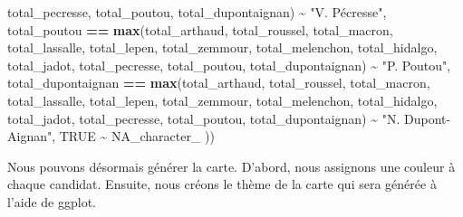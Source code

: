 \documentclass[
]{article}
\newenvironment{Shaded}{\begin{snugshade}}{\end{snugshade}}
\newcommand{\ConstantTok}[1]{\textcolor[rgb]{0.56,0.35,0.01}{#1}}
\newcommand{\FunctionTok}[1]{\textcolor[rgb]{0.13,0.29,0.53}{\textbf{#1}}}
\newcommand{\NormalTok}[1]{#1}
\newcommand{\SpecialCharTok}[1]{\textcolor[rgb]{0.81,0.36,0.00}{\textbf{#1}}}
\newcommand{\StringTok}[1]{\textcolor[rgb]{0.31,0.60,0.02}{#1}}
\begin{document}
\begin{Shaded}
\begin{Highlighting}[]
\NormalTok{                          total\_pecresse, total\_poutou, total\_dupontaignan) }\SpecialCharTok{\textasciitilde{}} \StringTok{"V. Pécresse"}\NormalTok{,}
\NormalTok{    total\_poutou }\SpecialCharTok{==} \FunctionTok{max}\NormalTok{(total\_arthaud, total\_roussel, total\_macron, }
\NormalTok{                        total\_lassalle, total\_lepen, total\_zemmour, }
\NormalTok{                        total\_melenchon, total\_hidalgo, total\_jadot, }
\NormalTok{                        total\_pecresse, total\_poutou, total\_dupontaignan) }\SpecialCharTok{\textasciitilde{}} \StringTok{"P. Poutou"}\NormalTok{,}
\NormalTok{    total\_dupontaignan }\SpecialCharTok{==} \FunctionTok{max}\NormalTok{(total\_arthaud, total\_roussel, total\_macron, }
\NormalTok{                              total\_lassalle, total\_lepen, total\_zemmour, }
\NormalTok{                              total\_melenchon, total\_hidalgo, total\_jadot, }
\NormalTok{                              total\_pecresse, total\_poutou, total\_dupontaignan) }\SpecialCharTok{\textasciitilde{}} \StringTok{"N. Dupont{-}Aignan"}\NormalTok{,}
    \ConstantTok{TRUE} \SpecialCharTok{\textasciitilde{}} \ConstantTok{NA\_character\_}
\NormalTok{  ))}
\end{Highlighting}
\end{Shaded}

Nous pouvons désormais générer la carte. D'abord, nous assignons une
couleur à chaque candidat. Ensuite, nous créons le thème de la carte qui
sera générée à l'aide de ggplot.
\end{document}

